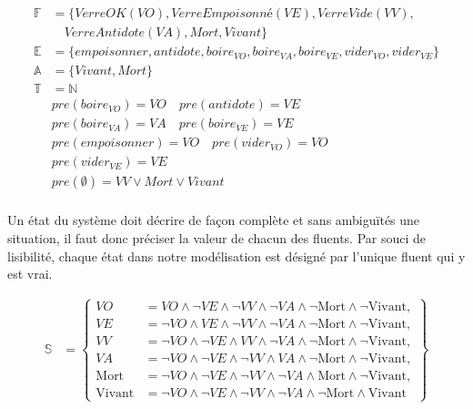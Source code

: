\begin{equation*}
    \begin{aligned}
        \mathds{F} & = \{VerreOK (VO), \textit{VerreEmpoisonné} (VE),VerreVide (VV), \\ & \quad VerreAntidote (VA),Mort,Vivant\}\\ 
        \mathds{E} & = \{empoisonner,antidote,boire_{VO},boire_{VA},boire_{VE},vider_{VO}, vider_{VE}\}\\
        \mathds{A} & = \{ Vivant,Mort\}\\
        \mathds{T}& = \mathds{N} \\
        & pre(boire_{VO})  = VO \quad pre(antidote) = VE \\
        & pre(boire_{VA}) = VA \quad pre(boire_{VE}) = VE \\
        & pre(empoisonner) = VO \quad pre(vider_{VO}) = VO \\
        & pre(vider_{VE}) = VE \\
        & pre(\emptyset) = VV \vee Mort \vee Vivant\\
    \end{aligned}
\end{equation*}

Un état du système doit décrire de façon complète et sans ambiguïtés une situation, il faut donc préciser la valeur de chacun des fluents. Par souci de lisibilité, chaque état dans notre modélisation est désigné par l'unique fluent qui y est vrai.

\begin{equation*}
    \begin{aligned}
        \mathds{S} & = \left\{
        \begin{aligned}
        VO     &= VO     \wedge \neg VE \wedge \neg VV \wedge \neg VA \wedge \neg \text{Mort} \wedge \neg \text{Vivant}, \\
        VE     &= \neg VO \wedge VE     \wedge \neg VV \wedge \neg VA \wedge \neg \text{Mort} \wedge \neg \text{Vivant}, \\
        VV     &= \neg VO \wedge \neg VE \wedge VV     \wedge \neg VA \wedge \neg \text{Mort} \wedge \neg \text{Vivant}, \\
        VA     &= \neg VO \wedge \neg VE \wedge \neg VV \wedge VA     \wedge \neg \text{Mort} \wedge \neg \text{Vivant}, \\
        \text{Mort}   &= \neg VO \wedge \neg VE \wedge \neg VV \wedge \neg VA \wedge \text{Mort}   \wedge \neg \text{Vivant}, \\
        \text{Vivant} &= \neg VO \wedge \neg VE \wedge \neg VV \wedge \neg VA \wedge \neg \text{Mort} \wedge \text{Vivant}
        \end{aligned}
        \right\}\\
    \end{aligned}
\end{equation*}

